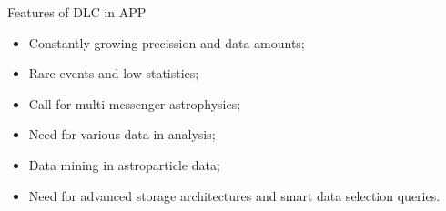 
\begin{frame}{Features of DLC in APP}
    \begin{minipage}[c]{0.64\textwidth}
        \begin{itemize}
            \item Constantly growing precission and data amounts;
            \item Rare events and low statistics;
            \item Call for multi-messenger astrophysics;
            \item Need for various data in analysis;
            \item Data mining in astroparticle data;
            \item Need for advanced storage architectures and smart data selection queries.




\end{itemize}
\end{minipage}
\end{frame}

